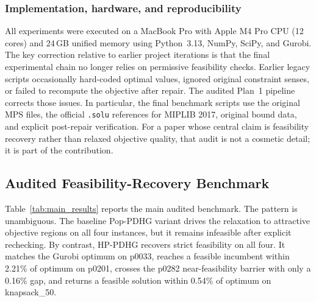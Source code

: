 \subsubsection{Implementation, hardware, and reproducibility}

All experiments were executed on a MacBook Pro with Apple M4 Pro CPU (12 cores) and 24\,GB unified memory using Python~3.13, NumPy, SciPy, and Gurobi. The key correction relative to earlier project iterations is that the final experimental chain no longer relies on permissive feasibility checks. Earlier legacy scripts occasionally hard-coded optimal values, ignored original constraint senses, or failed to recompute the objective after repair. The audited Plan~1 pipeline corrects those issues. In particular, the final benchmark scripts use the original MPS files, the official \texttt{.solu} references for MIPLIB 2017, original bound data, and explicit post-repair verification. For a paper whose central claim is feasibility recovery rather than relaxed objective quality, that audit is not a cosmetic detail; it is part of the contribution.

\subsection{Audited Feasibility-Recovery Benchmark}
\label{subsec:main_results}

Table~\ref{tab:main_results} reports the main audited benchmark. The pattern is unambiguous. The baseline Pop-PDHG variant drives the relaxation to attractive objective regions on all four instances, but it remains infeasible after explicit rechecking. By contrast, HP-PDHG recovers strict feasibility on all four. It matches the Gurobi optimum on p0033, reaches a feasible incumbent within 2.21\% of optimum on p0201, crosses the p0282 near-feasibility barrier with only a 0.16\% gap, and returns a feasible solution within 0.54\% of optimum on knapsack\_50.

